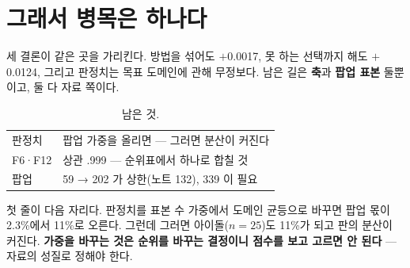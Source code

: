 \documentclass[10pt]{article}
\begin{document}


\section{그래서 병목은 하나다}

세 결론이 같은 곳을 가리킨다. 방법을 섞어도 $+$0.0017, 못 하는 선택까지
해도 $+$0.0124, 그리고 판정치는 목표 도메인에 관해 무정보다. 남은 길은
\textbf{축}과 \textbf{팝업 표본} 둘뿐이고, 둘 다 자료 쪽이다.

\begin{table}[t]
\centering\tsize
\caption{남은 것.}
\begin{tabular}{ll}
\toprule
판정치 & 팝업 가중을 올리면 --- 그러면 분산이 커진다 \\
F6·F12 & 상관 .999 --- 순위표에서 하나로 합칠 것 \\
팝업 & 59 → 202 가 상한(노트 132), 339 이 필요 \\
\bottomrule
\end{tabular}
\end{table}

첫 줄이 다음 자리다. 판정치를 표본 수 가중에서 도메인 균등으로 바꾸면
팝업 몫이 2.3\%에서 11\%로 오른다. 그런데 그러면 아이돌($n{=}25$)도 11\%가
되고 판의 분산이 커진다. \textbf{가중을 바꾸는 것은 순위를 바꾸는 결정이니
점수를 보고 고르면 안 된다} --- 자료의 성질로 정해야 한다.
\end{document}
